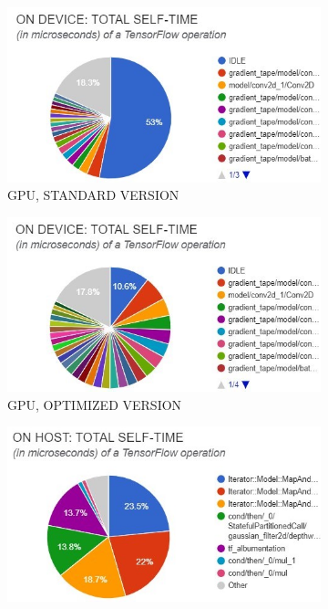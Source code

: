 \begin{figure}[!h]
	\begin{center}
		\begin{subfigure}[h]{0.49\textwidth}
			\centering
			\includegraphics[width=1\textwidth]{"contents/images/05-profiling-CVPRaug-std-gpu"}
			\caption[]{GPU, STANDARD VERSION}
		\end{subfigure}
		\hfill
		\begin{subfigure}[h]{0.49\textwidth}
			\centering
			\includegraphics[width=1\textwidth]{"contents/images/05-profiling-CVPRaug-opt-gpu"}
			\caption[]{GPU, OPTIMIZED VERSION}
		\end{subfigure}
		\vfill
	    \vspace{0.5cm}
		\begin{subfigure}[h]{0.49\textwidth}
			\centering
			\includegraphics[width=1\textwidth]{"contents/images/05-profiling-CVPRaug-std-cpu"}

\end{subfigure}
\end{center}
\end{figure}

